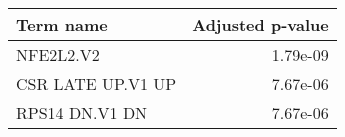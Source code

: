 \begin{tabular}{lr}
\toprule
        Term name &  Adjusted p-value \\
\midrule
        NFE2L2.V2 &          1.79e-09 \\
CSR LATE UP.V1 UP &          7.67e-06 \\
   RPS14 DN.V1 DN &          7.67e-06 \\
\bottomrule
\end{tabular}
